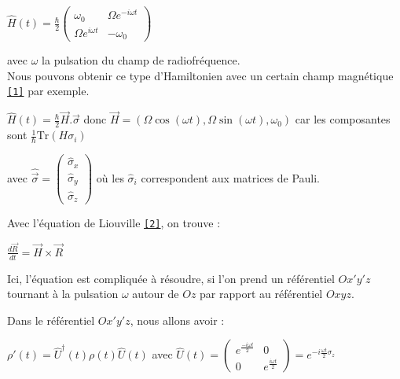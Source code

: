\documentclass[11pt]{article}
\begin{document}
\begin{tabbing}
    \qquad $\hat H(t) = \frac{\hbar}{2} \begin{pmatrix}
\omega_0  & \Omega e^{-i\omega t} \\
\Omega e^{i\omega t}  & - \omega_0 
\end{pmatrix}$
\end{tabbing}

avec $\omega$ la pulsation du champ de radiofréquence. \\
\vspace{0.2cm}
Nous pouvons obtenir ce type d'Hamiltonien avec un certain champ magnétique \hyperref[sec:B]{\texttt{[1]}} par exemple.

\begin{tabbing}
    \quad $\hat H(t) = \frac{\hbar}{2} \Vec{H}.\Vec{\sigma}$ \quad donc $\Vec{H} = (\Omega \cos(\omega t), \Omega \sin(\omega t), \omega_0)$ \quad car les composantes sont $\frac{1}{\hbar} \text{Tr}(H\sigma_i)$
\end{tabbing}

avec $\hat{\Vec{\sigma}} = \begin{pmatrix}
\hat \sigma_x  \\
\hat \sigma_y \\
\hat \sigma_z
\end{pmatrix}$ où les $\hat \sigma_i$ correspondent aux matrices de Pauli.

Avec l'équation de Liouville \hyperref[sec:Liouville]{\texttt{[2]}}, on trouve :

\begin{tabbing}
    \qquad $\frac{d\Vec{R}}{dt} = \Vec{H}\times \Vec{R}$
\end{tabbing}

Ici, l'équation est compliquée à résoudre, si l'on prend un référentiel $Ox'y'z$ tournant à la pulsation $\omega$ autour de $Oz$ par rapport au référentiel $Oxyz$.

Dans le référentiel $Ox'y'z$, nous allons avoir :

\vspace{0.5cm}

\qquad $\rho'(t) = \hat U^\dagger(t) \rho(t) \hat U(t)$ \quad avec \quad $\hat U(t) = \begin{pmatrix}
e^{\frac{-i\omega t}{2}}  & 0 \\
0  & e^{\frac{i\omega t}{2}}
\end{pmatrix} = e^{-i\frac{\omega t}{2}\sigma_z}$

\vspace{0.4cm}
\end{document}
